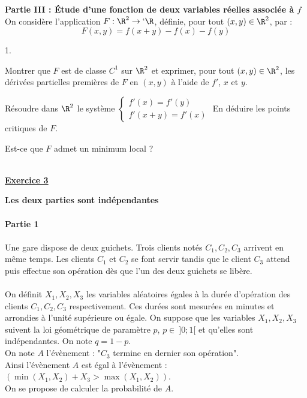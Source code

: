 \documentclass[11pt]{article}%
\begin{document}
{\bf Partie III : Étude d'une fonction de deux variables réelles
associée à $f$}\\

On considère l'application $F :\R^{2}\rightarrow`\R$, définie, pour
tout $(x,y)\in \R^{2}$, par : 
\[
F(x,y) = f(x + y)-f(x)-f(y)
\]
\begin{noliste}{1.}
 \setlength{\itemsep}{4mm}
\item Montrer que $F$ est de classe $C^{1}$ sur $\R^{2}$ et exprimer,
pour tout $(x,y)\in \R^{2}$, les dérivées partielles premières de $F$
en $(x,y)$ à l'aide de $f'$, $x$ et $y$.
\item Résoudre dans $\R^{2}$ le système $\left\{ 
\begin{array}{ll}
 f'(x) = f'(y)\\
f'(x + y) = f'(x)
\end{array}
\right.$ En déduire les points critiques de $F$.
\item Est-ce que $F$ admet un minimum local ?\\
\\
\end{noliste}

\newpage

\begin{center}
\underline{\bf Exercice 3}
\end{center}

{\bf Les deux parties sont indépendantes}\\
\\
{\bf Partie 1}\\
\\
Une gare dispose de deux guichets. Trois clients notés $C_{1}, C_{2},
C_{3}$ arrivent en même temps. Les clients $C_{1}$ et $C_{2}$ se font
servir tandis que le client $C_{3}$ attend puis effectue son opération
dès que l'un des deux guichets se libère.\\
\\
On définit $X_{1}, X_{2}, X_{3}$ les variables aléatoires égales à la
durée d'opération des clients $C_{1}, C_{2}, C_{3}$ respectivement. Ces
durées sont mesurées en minutes et arrondies à l'unité supérieure ou
égale. On suppose que les variables $X_{1}, X_{2}, X_{3}$ suivent la
loi géométrique de paramètre $p$, $p\in \ ]0;1[$ et qu'elles sont
indépendantes. On note $q = 1-p$.\\

On note $A$ l'évènement : "$C_{3}$ termine en dernier son opération".\\
Ainsi l'évènement $A$ est égal à l'évènement : $(\min(X_{1},X_{2}) +
X_{3}>\max(X_{1},X_{2}))$.\\
On se propose de calculer la probabilité de $A$.\\
\end{document}
